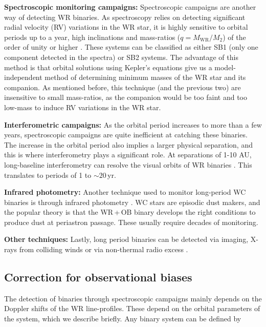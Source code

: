 \textbf{Spectroscopic monitoring campaigns:} Spectroscopic campaigns are another way of detecting WR binaries. As spectroscopy relies on detecting significant radial velocity (RV) variations in the WR star, it is highly sensitive to orbital periods up to a year, high inclinations and mass-ratios ($q=M_\textrm{WR}/M_2$) of the order of unity or higher \citep[see e.g.,][]{1998Marchenko1998WR141,2012David-Uraz,2021Richardson}. These systems can be classified as either SB1 (only one component detected in the spectra) or SB2 systems. The advantage of this method is that orbital solutions using Kepler's equations give us a model-independent method of determining minimum masses of the WR star and its companion. As mentioned before, this technique (and the previous two) are insensitive to small mass-ratios, as the companion would be too faint and too low-mass to induce RV variations in the WR star. 

\textbf{Interferometric campaigns:} As the orbital period increases to more than a few years, spectroscopic campaigns are quite inefficient at catching these binaries. The increase in the orbital period also implies a larger physical separation, and this is where interferometry plays a significant role. At separations of 1-10 AU, long-baseline interferometry can resolve the visual orbits of WR binaries \citep[e.g. for WR 113 and WR 140, respectively:][]{2021Richardson,thomas_orbit_2021}. This translates to periods of 1 to ${\sim}20\,$yr. 

\textbf{Infrared photometry:} Another technique used to monitor long-period WC binaries is through infrared photometry \citep{1995Williamsdust,1999MarchenkoDust,2001WilliamsDust,2005Williams,2019WilliamsNEOWISE}. WC stars are episodic dust makers, and the popular theory is that the WR\,+\,OB binary develops the right conditions to produce dust at periastron passage. These usually require decades of monitoring. 

\textbf{Other techniques:} Lastly, long period binaries can be detected via imaging, X-rays from colliding winds or via non-thermal radio excess \citep[e.g.][]{1996Dougherty, 2000Dougherty, 2017Zhekov,2020Rodriguez, 2020Zhekov}. 

\subsection{Correction for observational biases} \label{sect:obs_bias_intro}

The detection of binaries through spectroscopic campaigns mainly depends on the Doppler shifts of the WR line-profiles. These depend on the orbital parameters of the system, which we describe briefly. Any binary system can be defined by


